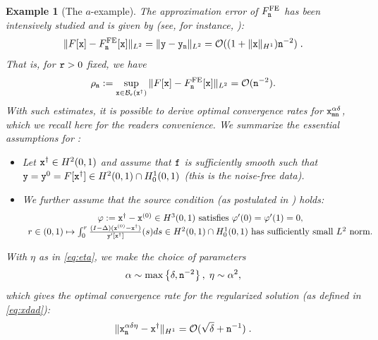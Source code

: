 \documentclass[10pt]{article}
\numberwithin{equation}{section}
\newtheorem{example}[example]{Example}
\theoremstyle{nonumberplain}
\newcommand{\norms}[1]{\|#1\|}
\newcommand{\set}[1]{\left\{#1\right\}}
\newcommand{\y}{{\tt y}}
\newcommand{\m}{{\tt m}}
\newcommand{\n}{{\tt n}}
\newcommand{\x}{{\tt x}}
\newcommand{\xdag}{\x^\dagger}
\begin{document}
\begin{example}[The $a$-example]
	The approximation error of $F^{\text{FE}}_\n$ has been intensively studied and is given by (see, for instance, \cite{Aub67,Nit68,Cia78}):
	\begin{equation}\label{eq:a-aproxi-error}
		\norms{F[\x] - F^{\text{FE}}_\n[\x]}_{L^2} = \norms{\y-\y_\n}_{L^2} = \mathcal{O}((1+\norms{\x}_{H^1})\n^{-2})\;.
	\end{equation}
	That is, for ${\tt r} > 0$ fixed, we have  
	\begin{equation*}
		\rho_\n :=  \sup_{\x \in \mathcal{B}_{\tt r}(\xdag)} \norms{F[\x] - F^{\text{FE}}_\n[\x]}_{L^2} = \mathcal{O}(\n^{-2}).
	\end{equation*}
	With such estimates, it is possible to derive optimal convergence rates for $\x_{\m\n}^{\alpha\delta}$, which we recall here for the readers convenience. We summarize the essential assumptions for \cite[Corollary 3.5]{NeuSch90}:

    \begin{itemize}
        \item Let $\xdag\in H^2(0,1)$ and assume that $\tt f$ is sufficiently smooth such that $\y=\y^0=F[\xdag] \in H^2(0,1)\cap H^1_0(0,1)$ (this is the noise-free data). 
        \item We further assume that the \emph{source condition} (as postulated in \cite{EngKunNeu89,NeuSch90}) holds:
	   \begin{equation}\label{de:source_a}	
		  \begin{array}{c}
			\varphi:=\xdag-\x^{(0)} \in H^3(0,1) \text{ satisfies } \varphi'(0)=\varphi'(1)=0,\\
       r \in (0,1) \mapsto \int_0^r \frac{(I-\Delta)(\x^{(0)}-\xdag)}{\y'[\xdag]}(s) ds \in H^2(0,1)\cap H_0^1(0,1) \text{ has sufficiently small }L^2\text{ norm.}
            \end{array}
            \end{equation}
\end{itemize}
With $\eta$ as in \autoref{eq:eta}, we make the choice of parameters
		\begin{equation} \label{eq:par}
		 \alpha \sim \max \set{\delta,\n^{-2}}, \; \eta \sim \alpha^2,
		\end{equation}
	    which gives the optimal convergence rate for the regularized solution (as defined in \autoref{eq:xdad}): 
	    \begin{equation} \label{eq:es}
	    	\norms{\x_\n^{\alpha\delta\eta} - \xdag}_{H^1} = \mathcal{O}(\sqrt{\delta}+\n^{-1})\;.
	    \end{equation}
	\end{example}
\end{document}
